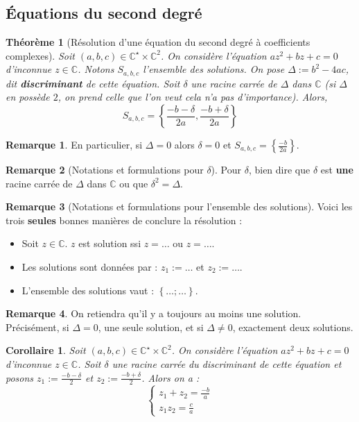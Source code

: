 \documentclass[french]{book}
\newcommand{\C}{\mathbb{C}}
\newcommand{\st}{^\star}
\theoremstyle{plain}
\newtheorem{thm}{Théorème}[chapter]
\newtheorem{cor}{Corollaire}[chapter]
\theoremstyle{definition}
\newtheorem{rmq}{Remarque}[chapter]
\theoremstyle{remark}
\begin{document}
\subsection{Équations du second degré}
\begin{thm}[Résolution d'une équation du second degré à coefficients complexes]
	Soit $(a,b,c)\in\C\st\times\C^2$. On considère l'équation $az^2+bz+c=0$ d'inconnue $z\in\C$. Notons $S_{a,b,c}$ l'ensemble des solutions. On pose $\Delta:=b^2-4ac$, dit \textbf{discriminant} de cette équation. Soit $\delta$ une racine carrée de $\Delta$ dans $\C$ (si $\Delta$ en possède $2$, on prend celle que l'on veut cela n'a pas d'importance). Alors, $$S_{a,b,c}=\left\{\frac{-b-\delta}{2a},\frac{-b+\delta}{2a}\right\}$$
\end{thm}
\begin{rmq}
	En particulier, si $\Delta=0$ alors $\delta=0$ et $\displaystyle S_{a,b,c}=\left\{\frac{-b}{2a}\right\}$.
\end{rmq}
\begin{rmq}[Notations et formulations pour $\delta$]
	Pour $\delta$, bien dire que $\delta$ est \textbf{une} racine carrée de $\Delta$ dans $\C$ ou que $\delta^2=\Delta$.
\end{rmq}
\begin{rmq}[Notations et formulations pour l'ensemble des solutions]
	Voici les trois \textbf{seules} bonnes manières de conclure la résolution : \begin{itemize}
		\item Soit $z\in\C$. $z$ est solution ssi $z=\ldots$ ou $z=\ldots$.
		\item Les solutions sont données par : $z_1:=\ldots$ et $z_2:=\ldots$.
		\item L'ensemble des solutions vaut : $\left\{\ldots;\ldots\right\}$.
	\end{itemize}
\end{rmq}
\begin{rmq}
	On retiendra qu'il y a toujours au moins une solution. Précisément, si $\Delta=0$, une seule solution, et si $\Delta\ne0$, exactement deux solutions.
\end{rmq}
\begin{cor}
	Soit $(a,b,c)\in\C\st\times\C^2$. On considère l'équation $az^2+bz+c=0$ d'inconnue $z\in\C$. Soit $\delta$ une racine carrée du discriminant de cette équation et posons $\displaystyle z_1:=\frac{-b-\delta}{2}$ et $\displaystyle z_2:=\frac{-b+\delta}{2}$. Alors on a : $$\begin{cases}
		z_1+z_2=\displaystyle\frac{-b}{a}\\ z_1z_2=\displaystyle\frac{c}{a}
	\end{cases}$$
\end{cor}
\end{document}
